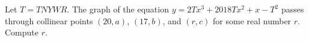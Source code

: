 Let $T=TNYWR$. The graph of the equation $y=2Tx^3+2018Tx^2+x-T^2$ passes through collinear points $\left(20,a\right)$, $\left(17,b\right)$, and $\left(r,c\right)$ for some real number $r$. Compute $r$.